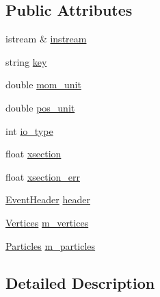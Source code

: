 \subsection*{Public Attributes}
\begin{DoxyCompactItemize}
\item 
istream \& \hyperlink{class_d_d4hep_1_1_simulation_1_1_hep_m_c_1_1_event_stream_a2702d64e41d9b280f84ebbae47521125}{instream}
\item 
string \hyperlink{class_d_d4hep_1_1_simulation_1_1_hep_m_c_1_1_event_stream_ac17d00d243288f0b1dec90a167b57868}{key}
\item 
double \hyperlink{class_d_d4hep_1_1_simulation_1_1_hep_m_c_1_1_event_stream_a3f8d6aeef7a8fa342bc15e7b17eb7d40}{mom\+\_\+unit}
\item 
double \hyperlink{class_d_d4hep_1_1_simulation_1_1_hep_m_c_1_1_event_stream_ab528124a867412138e1d22b2310c1bad}{pos\+\_\+unit}
\item 
int \hyperlink{class_d_d4hep_1_1_simulation_1_1_hep_m_c_1_1_event_stream_ab72b33619d738dd59539035f4e02792f}{io\+\_\+type}
\item 
float \hyperlink{class_d_d4hep_1_1_simulation_1_1_hep_m_c_1_1_event_stream_a3f6b9fa99fe2752282e3650c51ad4918}{xsection}
\item 
float \hyperlink{class_d_d4hep_1_1_simulation_1_1_hep_m_c_1_1_event_stream_ab2ad757474584ec785c50c36181b2ae2}{xsection\+\_\+err}
\item 
\hyperlink{class_d_d4hep_1_1_simulation_1_1_hep_m_c_1_1_event_header}{Event\+Header} \hyperlink{class_d_d4hep_1_1_simulation_1_1_hep_m_c_1_1_event_stream_ac60c5b73780a0d523e2042a93610dfe3}{header}
\item 
\hyperlink{class_d_d4hep_1_1_simulation_1_1_hep_m_c_1_1_event_stream_a3e270d38edde8369e52ad396615a2755}{Vertices} \hyperlink{class_d_d4hep_1_1_simulation_1_1_hep_m_c_1_1_event_stream_a714f7fea3a85b72aa7c925c580a2fe36}{m\+\_\+vertices}
\item 
\hyperlink{class_d_d4hep_1_1_simulation_1_1_hep_m_c_1_1_event_stream_a99e0260f816229d8ab3ebdd5487b3af1}{Particles} \hyperlink{class_d_d4hep_1_1_simulation_1_1_hep_m_c_1_1_event_stream_a40291edf72d71405515c98ea77e6670c}{m\+\_\+particles}
\end{DoxyCompactItemize}


\subsection{Detailed Description}


